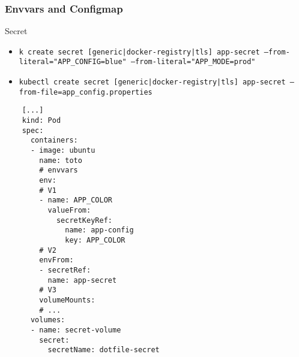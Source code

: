 
\subsubsection{Envvars and Configmap}
\begin{frame}[fragile]{Secret}
  \begin{itemize}
    \item \texttt{k create secret [generic|docker-registry|tls] app-secret --from-literal="APP\_CONFIG=blue" --from-literal="APP\_MODE=prod"}
    \item \texttt{kubectl create secret [generic|docker-registry|tls] app-secret --from-file=app\_config.properties}
  \end{itemize}
  \begin{lstlisting}
    [...]
    kind: Pod
    spec:
      containers:
      - image: ubuntu
        name: toto
        # envvars
        env:
        # V1
        - name: APP_COLOR
          valueFrom:
            secretKeyRef:
              name: app-config
              key: APP_COLOR
        # V2
        envFrom:
        - secretRef:
          name: app-secret
        # V3
        volumeMounts:
        # ...
      volumes:
      - name: secret-volume
        secret:
          secretName: dotfile-secret
  \end{lstlisting}
\end{frame}
